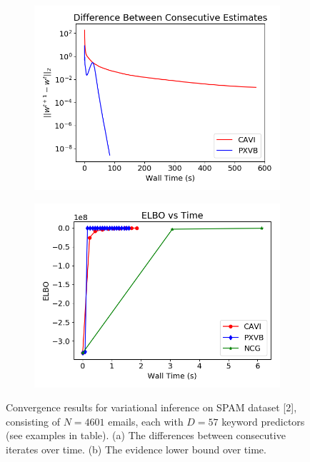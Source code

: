 \documentclass{article}
\begin{document}
\begin{figure}[tb]
        \begin{subfigure}[t]{0.49\textwidth}
        \includegraphics[width=\textwidth]{Probit_real/CAVI_PX_convergence.png}
    \end{subfigure}
          \begin{subfigure}[t]{0.49\textwidth}
        \includegraphics[width=\textwidth]{Probit_real/elbo_time.png}
    \end{subfigure}
    \caption{Convergence results for variational inference on SPAM dataset [2], consisting of $N= 4601$ emails, each with $D=57$ keyword predictors (see examples in table). (a) The differences between consecutive iterates over time. (b) The evidence lower bound over time. } %
    \label{fig:Probit_spam}
\end{figure}
\end{document}
